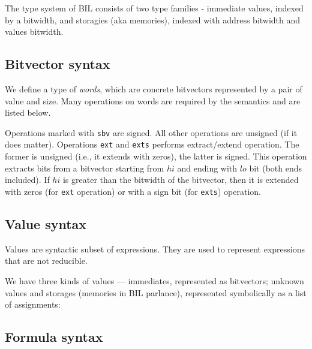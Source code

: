 \documentclass[11pt]{article}
\begin{document}
\ottgrammartabular{
\ottvar\ottinterrule
}

\ottgrammartabular{
\ottbop\ottinterrule
\ottuop\ottinterrule
\ottendian\ottinterrule
\ottcast\ottinterrule
}

The type system of BIL consists of two type families - immediate
values, indexed by a bitwidth, and storagies (aka memories), indexed
with address bitwidth and values bitwidth.

\ottgrammartabular{
\otttype\ottinterrule
}

\subsection{Bitvector syntax}
\label{sec:bitvector}

We define a type of {\em words}, which are concrete bitvectors
represented by a pair of value and size.  Many operations on words are
required by the semantics and are listed below.

Operations marked with \verb|sbv| are signed. All other operations are
unsigned (if it does matter).  Operations \verb|ext| and \verb|exts|
performs extract/extend operation. The former is unsigned (i.e., it
extends with zeros), the latter is signed. This operation extracts
bits from a bitvector starting from $\mathit{hi}$ and ending with
$\mathit{lo}$ bit (both ends included). If $\mathit{hi}$ is greater
than the bitwidth of the bitvector, then it is extended with zeros
(for \verb|ext| operation) or with a sign bit (for \verb|exts|)
operation.

\ottgrammartabular{
\ottword\ottinterrule
}

\subsection{Value syntax}
\label{sec:values}

Values are syntactic subset of expressions. They are used to represent
expressions that are not reducible.

We have three kinds of values --- immediates, represented as
bitvectors; unknown values and storages (memories in BIL parlance),
represented symbolically as a list of assignments:

\ottgrammartabular{
\ottval\ottinterrule
}


\subsection{Formula syntax}
\label{sec:formula}
\end{document}
